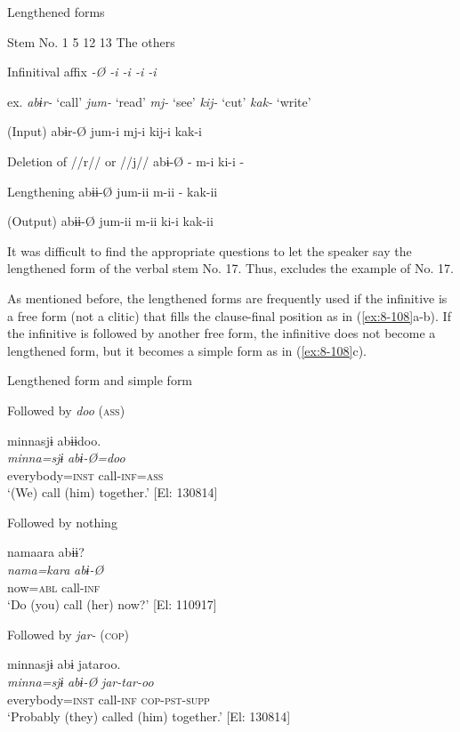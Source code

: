 \begin{table}
\caption{\label{tab:key:83}Lengthened forms}

Stem No.  1  5  12  13  The others

Infinitival affix  \textit{-Ø  -i  -i  -i  -i}

ex.  \textit{abɨr-} ‘call’  \textit{jum-} ‘read’  \textit{mj-} ‘see’  \textit{kij-} ‘cut’  \textit{kak-} ‘write’

(Input)  abɨr-Ø  jum-i  mj-i  kij-i  kak-i

Deletion of //r// or //j//  abɨ-Ø  -  m-i  ki-i  -

Lengthening  abɨɨ-Ø  jum-ii  m-ii  -  kak-ii

(Output)  abɨɨ-Ø  jum-ii  m-ii  ki-i  kak-ii
\end{table}

It was difficult to find the appropriate questions to let the speaker say the lengthened form of the verbal stem No. 17. Thus,  excludes the example of No. 17. 

As mentioned before, the lengthened forms are frequently used if the infinitive is a free form (not a clitic) that fills the clause-final position as in (\ref{ex:8-108}a-b). If the infinitive is followed by another free form, the infinitive does not become a lengthened form, but it becomes a simple form as in (\ref{ex:8-108}c).

\ea\label{ex:8-108}
  Lengthened form and simple form

\ea Followed by \textit{doo} (\textsc{ass})

{\TM}
\glll  minnasjɨ  abɨɨdoo.\\
\textit{minna=sjɨ}  \textit{abɨ-Ø=doo}\\
everybody=\textsc{inst}  call-\textsc{inf}=\textsc{ass}\\
\glt ‘(We) call (him) together.’ [El: 130814]


\ex  Followed by nothing

{\TM}
\glll  namaara  abɨɨ?\\
\textit{nama=kara}  \textit{abɨ-Ø}\\
now=\textsc{abl}  call-\textsc{inf}\\
\glt ‘Do (you) call (her) now?’ [El: 110917]


\ex  Followed by \textit{jar-} (\textsc{cop})

{\TM}
\glll  minnasjɨ  abɨ  jataroo.\\
\textit{minna=sjɨ}  \textit{abɨ-Ø}  \textit{jar-tar-oo}\\
everybody=\textsc{inst}  call-\textsc{inf}  \textsc{cop}-\textsc{pst}-\textsc{supp}\\
\glt ‘Probably (they) called (him) together.’ [El: 130814]
\z
\z

